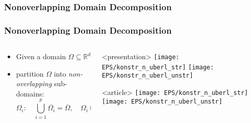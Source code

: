\subsubsection{Nonoverlapping Domain Decomposition}
\begin{frame}
  \frametitle<presentation>{Nonoverlapping Domain Decomposition}

  \begin{columns}
    \begin{column}{0.6\linewidth}

      \begin{itemize}
      \item Given a domain $\Omega\subseteq\mathbb{R}^d$
      \item partition $\Omega$ into \emph{non-overlapping}
        sub-domains:
        \[
        \Omega_i\colon\quad \bigcup_{i=1}^p \overline{\Omega_i} = \overline{\Omega}, \quad
        \Omega_i\cap\Omega_j=\emptyset \;\forall i\ne j.
        \]
      \end{itemize}
    \end{column}
    \begin{column}{0.4\linewidth}
      \begin{onlyenv}<presentation>
        \texttt{[image: EPS/konstr\_n\_uberl\_str]}
        \vskip5mm
        \texttt{[image: EPS/konstr\_n\_uberl\_unstr]}
      \end{onlyenv}
      \begin{onlyenv}<article>
        \texttt{[image: EPS/konstr\_n\_uberl\_str]}
        \vskip5mm
        \texttt{[image: EPS/konstr\_n\_uberl\_unstr]}
      \end{onlyenv}
    \end{column}
  \end{columns}
\end{frame}


